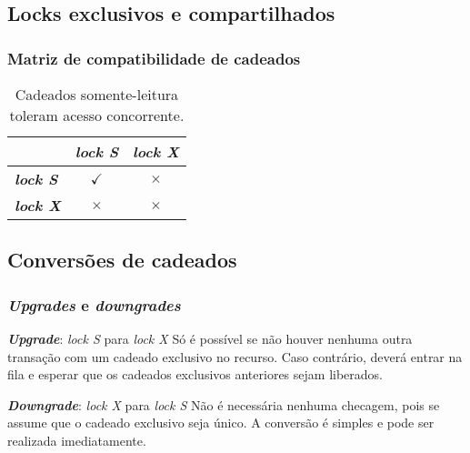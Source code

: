 \documentclass{beamer}
\begin{document}
\subsection{Locks exclusivos e compartilhados}

\begin{frame}
    \frametitle{Matriz de compatibilidade de cadeados}
    
    \begin{table}
    \begin{tabular}{l c c}
        \toprule

        \textbf{} & \textbf{\emph{lock S}} & \textbf{\emph{lock X}}\\

        \midrule

        \textbf{\emph{lock S}} & $\checkmark$ & $\times$ \\
        \textbf{\emph{lock X}} & $\times$ & $\times$ \\

        \bottomrule
    \end{tabular}
    \caption{Cadeados somente-leitura toleram acesso concorrente.}
    \end{table}
\end{frame}


\subsection{Conversões de cadeados} %

\begin{frame}

    \frametitle{\emph{Upgrades} e \emph{downgrades}}
    \begin{block}{\textbf{\emph{Upgrade}}: \emph{lock S} para \emph{lock X}}
        Só é possível se não houver nenhuma outra transação com um cadeado exclusivo no recurso. Caso contrário, deverá entrar na fila e esperar que os cadeados exclusivos anteriores sejam liberados.
    \end{block}

    \newblock
    \begin{block}{\textbf{\emph{Downgrade}}: \emph{lock X} para \emph{lock S}}
        Não é necessária nenhuma checagem, pois se assume que o cadeado exclusivo seja único. A conversão é simples e pode ser realizada imediatamente.
    \end{block}

\end{frame}
\end{document}
